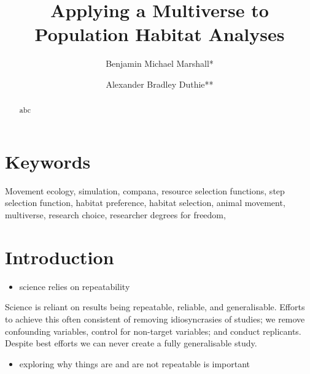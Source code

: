 \documentclass[10pt,a4paper]{article}
\providecommand{\tightlist}{%
  \setlength{\itemsep}{0pt}\setlength{\parskip}{0pt}}
\begin{document}
\pagestyle{fancy}

\title{Applying a Multiverse to Population Habitat Analyses}
\author[1]{Benjamin Michael Marshall*}
\author[1]{Alexander Bradley Duthie**}


\maketitle
\thispagestyle{fancy}

\begin{abstract}

abc

\end{abstract}

\section*{Keywords}

Movement ecology, simulation, compana, resource selection functions, step selection function, habitat preference, habitat selection, animal movement, multiverse, research choice, researcher degrees for freedom,

\clearpage
\pagestyle{fancy}

\hypertarget{introduction}{%
\section{Introduction}\label{introduction}}

\begin{itemize}
\tightlist
\item
  science relies on repeatability
\end{itemize}

Science is reliant on results being repeatable, reliable, and generalisable.
Efforts to achieve this often consistent of removing idiosyncrasies of studies; we remove confounding variables, control for non-target variables; and conduct replicants.
Despite best efforts we can never create a fully generalisable study.

\begin{itemize}
\tightlist
\item
  exploring why things are and are not repeatable is important
\end{itemize}
\end{document}
